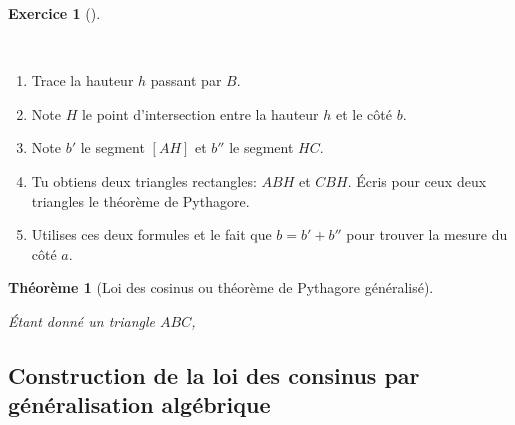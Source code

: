 \documentclass[
  a4paper,
  DIV=11,
  numbers=noendperiod,
  oneside]{scrreprt}
\providecommand{\tightlist}{%
  \setlength{\itemsep}{0pt}\setlength{\parskip}{0pt}}\usepackage{longtable,booktabs,array}
\theoremstyle{definition}
\theoremstyle{definition}
\newtheorem{exercise}{Exercice}[chapter]
\theoremstyle{plain}
\newtheorem{theorem}{Théorème}[chapter]
\theoremstyle{definition}
\theoremstyle{remark}
\begin{document}
\begin{exercise}[]\protect\hypertarget{exr-loi-sin}{}\label{exr-loi-sin}

~

\begin{enumerate}
\def\labelenumi{\arabic{enumi}.}
\tightlist
\item
  Trace la hauteur \(h\) passant par \(B\).
\item
  Note \(H\) le point d'intersection entre la hauteur \(h\) et le côté
  \(b\).
\item
  Note \(b'\) le segment \([AH]\) et \(b''\) le segment \(HC\).
\item
  Tu obtiens deux triangles rectangles: \(ABH\) et \(CBH\). Écris pour
  ceux deux triangles le théorème de Pythagore.
\item
  Utilises ces deux formules et le fait que \(b=b'+b''\) pour trouver la
  mesure du côté \(a\).
\end{enumerate}

\end{exercise}

\begin{theorem}[Loi des cosinus ou théorème de Pythagore
généralisé]\protect\hypertarget{thm-aire}{}\label{thm-aire}

Étant donné un triangle \(ABC\), \vspace{2cm}

\end{theorem}

\newpage

\subsection{Construction de la loi des consinus par généralisation
algébrique}\label{construction-de-la-loi-des-consinus-par-guxe9nuxe9ralisation-alguxe9brique}
\end{document}
